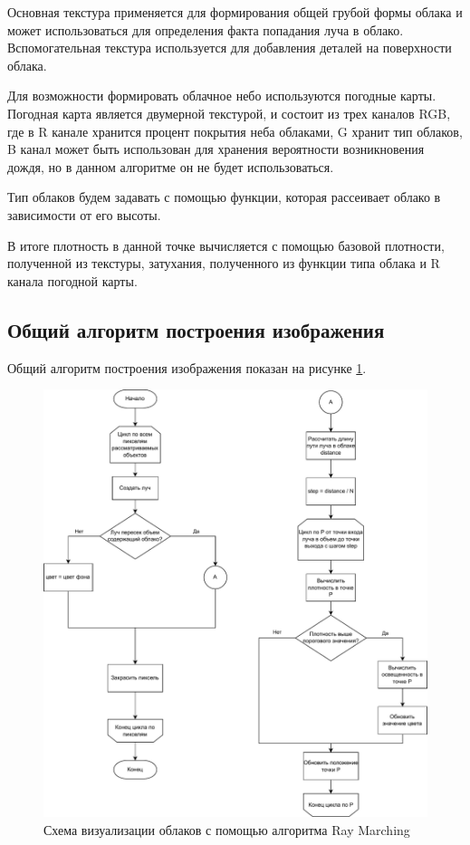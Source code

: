 Основная текстура применяется для формирования общей грубой формы облака и может использоваться для определения факта попадания луча в облако. Вспомогательная текстура используется для добавления деталей на поверхности облака.

Для возможности формировать облачное небо используются погодные карты. Погодная карта является двумерной текстурой, и состоит из трех каналов RGB, где в R канале хранится процент покрытия неба облаками, G хранит тип облаков, B канал может быть использован для хранения вероятности возникновения дождя, но в данном алгоритме он не будет использоваться. 

Тип облаков будем задавать с помощью функции, которая рассеивает облако в зависимости от его высоты. 

В итоге плотность в данной точке вычисляется с помощью базовой плотности, полученной из текстуры, затухания, полученного из функции типа облака и R канала погодной карты. 

\subsection{Общий алгоритм построения изображения}

Общий алгоритм построения изображения показан на рисунке \ref{fig:renderscheme}.

\begin{figure}
	\centering
	\includegraphics[width=1\textwidth]{assets/img/renderscheme2.pdf} %
	\caption{Схема визуализации облаков с помощью алгоритма Ray Marching}
	\label{fig:renderscheme}
\end{figure}


